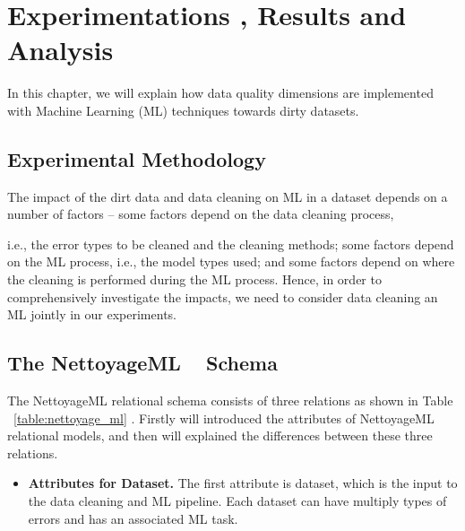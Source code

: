 \chapter{Experimentations , Results and Analysis}

\ifpdf
    \graphicspath{{Chapter4/Figs/Raster/}{Chapter4/Figs/PDF/}{Chapter4/Figs/}}
\else
    \graphicspath{{Chapter4/Figs/Vector/}{Chapter4/Figs/}}
\fi

In this chapter, we will explain how data quality dimensions are implemented with Machine Learning (ML) techniques towards dirty datasets. 

\section{Experimental Methodology}  

The impact of the dirt data and data cleaning on ML in a dataset depends on a number of factors -- some factors depend on the data cleaning process, 

i.e., the error types to be cleaned and the cleaning methods; some factors depend on the ML
process, i.e., the model types used; and some factors depend on where the cleaning is performed during the ML process. Hence, in order to comprehensively investigate the impacts, we need to consider data cleaning an ML jointly in our experiments.


\section{The NettoyageML ~\cite{Nettoyage2019} Schema}  

The NettoyageML relational schema consists of three relations as shown in Table ~\ref{table:nettoyage_ml} . Firstly will introduced the attributes of NettoyageML relational models, and then will explained 
the differences between these three relations.


\begin{itemize}
	\item {
		\textbf{Attributes for Dataset.} The first attribute is dataset, which is the input to the data cleaning and ML pipeline. Each dataset can have multiply types of errors and has an associated ML task. 
	}
\end{itemize}


